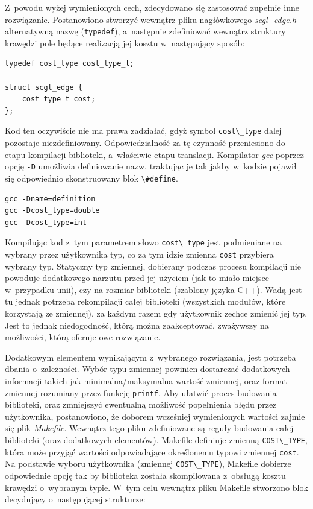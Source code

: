\documentclass[a4paper,12pt,polish,oneside,openright]{thesis}
\newcommand\code[1]{\lstinline[style=line]{#1}}
\begin{document}
Z~powodu wyżej wymienionych cech, zdecydowano się zastosować zupełnie inne rozwiązanie.
Postanowiono stworzyć wewnątrz pliku nagłówkowego \emph{scgl\_edge.h} alternatywną nazwę (\code{typedef}), a~następnie zdefiniować wewnątrz struktury krawędzi pole będące realizacją jej kosztu w~następujący sposób:
\begin{lstlisting}[style=code,caption=Koszt krawędzi w~bibliotece SCGL]
typedef cost_type cost_type_t;

struct scgl_edge {
	cost_type_t cost;
};
\end{lstlisting}
Kod ten oczywiście nie ma prawa zadziałać, gdyż symbol \code{cost\_type} dalej pozostaje niezdefiniowany.
Odpowiedzialność za tę czynność przeniesiono do etapu kompilacji biblioteki, a~właściwie etapu translacji.
Kompilator \emph{gcc} poprzez opcję \code{-D} umożliwia definiowanie nazw, traktując je tak jakby w~kodzie pojawił się odpowiednio skonstruowany blok \code{\#define}.
\begin{lstlisting}[style=coden]
gcc -Dname=definition
gcc -Dcost_type=double
gcc -Dcost_type=int
\end{lstlisting}
Kompilując kod z~tym parametrem słowo \code{cost\_type} jest podmieniane na wybrany przez użytkownika typ, co za tym idzie zmienna \code{cost} przybiera wybrany typ.
Statyczny typ zmiennej, dobierany podczas procesu kompilacji nie powoduje dodatkowego narzutu przed jej użyciem (jak to miało miejsce w~przypadku unii), czy na rozmiar biblioteki (szablony języka C++).
Wadą jest tu jednak potrzeba rekompilacji całej biblioteki (wszystkich modułów, które korzystają ze zmiennej), za każdym razem gdy użytkownik zechce zmienić jej typ.
Jest to jednak niedogodność, którą można zaakceptować, zważywszy na możliwości, którą oferuje owe rozwiązanie.

Dodatkowym elementem wynikającym z~wybranego rozwiązania, jest potrzeba dbania o~zależności.
Wybór typu zmiennej powinien dostarczać dodatkowych informacji takich jak minimalna/maksymalna wartość zmiennej, oraz format zmiennej rozumiany przez funkcję \code{printf}.
Aby ułatwić proces budowania biblioteki, oraz zmniejszyć ewentualną możliwość popełnienia błędu przez użytkownika, postanowiono, że doborem wcześniej wymienionych wartości zajmie się plik \emph{Makefile}.
Wewnątrz tego pliku zdefiniowane są reguły budowania całej biblioteki (oraz dodatkowych elementów).
Makefile definiuje zmienną \code{COST\_TYPE}, która może przyjąć wartości odpowiadające określonemu typowi zmiennej \code{cost}.
Na podstawie wyboru użytkownika (zmiennej \code{COST\_TYPE}), Makefile dobierze odpowiednie opcję tak by biblioteka została skompilowana z~obsługą kosztu krawędzi o~wybranym typie.
W~tym celu wewnątrz pliku Makefile stworzono blok decydujący o~następującej strukturze:
\end{document}
